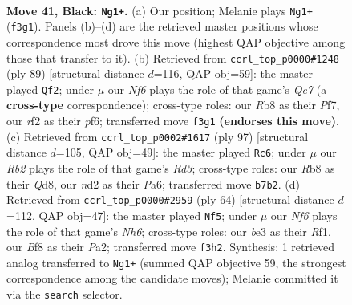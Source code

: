 \documentclass[11pt]{article}
\begin{document}
\clearpage

\begin{figure}[p]\centering
\begin{subfigure}{0.46\textwidth}\centering
\resizebox{\linewidth}{!}{%
\newchessgame
\chessboard[
  setfen={1r3bk1/1rn2p2/2Q5/4p3/R3P3/4Bn2/3NKRN1/7q b - - 7 41},
  showmover=false,
  pgfstyle=straightmove, color=movearrow, markmove={f3-g1}
]}
\caption{}
\end{subfigure}\hfill
\begin{subfigure}{0.46\textwidth}\centering
\resizebox{\linewidth}{!}{%
\newchessgame
\chessboard[
  setfen={8/5p1k/2n1rPpb/p2Q4/8/B6P/1PP1q3/1KNR4 b - - 2 45},
  showmover=false,
  pgfstyle=straightmove, color=movearrow, markmove={e2-f2}
]}
\caption{}
\end{subfigure}
\\[4pt]
\begin{subfigure}{0.46\textwidth}\centering
\resizebox{\linewidth}{!}{%
\newchessgame
\chessboard[
  setfen={3q4/7k/p2rb1p1/3NQ2n/2B1P3/8/1PR5/1K6 b - - 2 49},
  showmover=false,
  pgfstyle=straightmove, color=movearrow, markmove={d6-c6}
]}
\caption{}
\end{subfigure}\hfill
\begin{subfigure}{0.46\textwidth}\centering
\resizebox{\linewidth}{!}{%
\newchessgame
\chessboard[
  setfen={r2r3k/5pbp/7N/p2Rn3/4P3/2q5/P1B2QP1/5R1K w - - 1 33},
  showmover=false,
  pgfstyle=straightmove, color=movearrow, markmove={h6-f5}
]}
\caption{}
\end{subfigure}
\caption{\textbf{Move 41, Black: \texttt{Ng1+}.} (a) Our position; Melanie plays \texttt{Ng1+} (\texttt{f3g1}). Panels (b)--(d) are the retrieved master positions whose correspondence most drove this move (highest QAP objective among those that transfer to it). (b) Retrieved from \texttt{ccrl\_top\_p0000\#1248} (ply 89) [structural distance $d$=116, QAP obj=59]: the master played \texttt{Qf2}; under $\mu$ our \emph{Nf6} plays the role of that game's \emph{Qe7} (a \textbf{cross-type} correspondence); cross-type roles: our \emph{R}b8 as their \emph{P}f7, our \emph{r}f2 as their \emph{p}f6; transferred move \texttt{f3g1} \textbf{(endorses this move)}. (c) Retrieved from \texttt{ccrl\_top\_p0002\#1617} (ply 97) [structural distance $d$=105, QAP obj=49]: the master played \texttt{Rc6}; under $\mu$ our \emph{Rb2} plays the role of that game's \emph{Rd3}; cross-type roles: our \emph{R}b8 as their \emph{Q}d8, our \emph{n}d2 as their \emph{P}a6; transferred move \texttt{b7b2}. (d) Retrieved from \texttt{ccrl\_top\_p0000\#2959} (ply 64) [structural distance $d$=112, QAP obj=47]: the master played \texttt{Nf5}; under $\mu$ our \emph{Nf6} plays the role of that game's \emph{Nh6}; cross-type roles: our \emph{b}e3 as their \emph{R}f1, our \emph{B}f8 as their \emph{P}a2; transferred move \texttt{f3h2}. Synthesis: 1 retrieved analog transferred to \texttt{Ng1+} (summed QAP objective 59, the strongest correspondence among the candidate moves); Melanie committed it via the \texttt{search} selector.}
\label{fig:thought-m81}
\end{figure}
\end{document}
